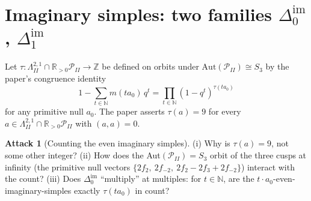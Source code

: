 \documentclass[11pt]{article}
\theoremstyle{definition}
\newtheorem{attack}[theorem]{Attack}
\providecommand{\Z}{\mathbb{Z}}
\providecommand{\R}{\mathbb{R}}
\providecommand{\N}{\mathbb{N}}
\providecommand{\Aut}{\mathrm{Aut}}
\providecommand{\LII}{\Lambda^{2,1}_{I\!I}}
\providecommand{\PII}{\mathcal{P}_{I\!I}}
\providecommand{\dim}{\Delta^{\mathrm{im}}}
\begin{document}
\section{Imaginary simples: two families $\dim_0$, $\dim_1$}

Let $\tau:\LII\cap\R_{>0}\PII\to\Z$ be defined on orbits under
$\Aut(\PII)\cong S_3$ by the paper's congruence identity
\[
1-\sum_{t\in\N} m(ta_0)\,q^t = \prod_{t\in\N}(1-q^t)^{\tau(ta_0)}
\]
for any primitive null $a_0$. The paper asserts $\tau(a)=9$ for every
$a\in\LII\cap\R_{>0}\PII$ with $(a,a)=0$.

\begin{attack}[Counting the even imaginary simples]
\label{att:even-imag-count}
(i) Why is $\tau(a)=9$, not some other integer?
(ii) How does the Aut$(\PII)=S_3$ orbit of the three cusps at infinity
(the primitive null vectors
$\{2f_2,\ 2f_{-2},\ 2f_2-2f_3+2f_{-2}\}$) interact with the count?
(iii) Does $\dim_0$ ``multiply'' at multiples: for $t\in\N$, are the
$t\cdot a_0$-even-imaginary-simples exactly $\tau(ta_0)$ in count?
\end{attack}
\end{document}
